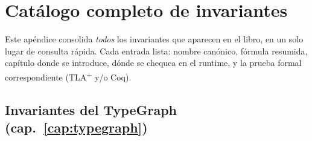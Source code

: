 \chapter{Catálogo completo de invariantes}
\label{ap:invariantes}

Este apéndice consolida \emph{todos} los invariantes que aparecen en
el libro, en un solo lugar de consulta rápida. Cada entrada lista:
nombre canónico, fórmula resumida, capítulo donde se introduce, dónde
se chequea en el runtime, y la prueba formal correspondiente
(TLA\textsuperscript{+} y/o Coq).

\section*{Invariantes del TypeGraph (cap.~\ref{cap:typegraph})}

